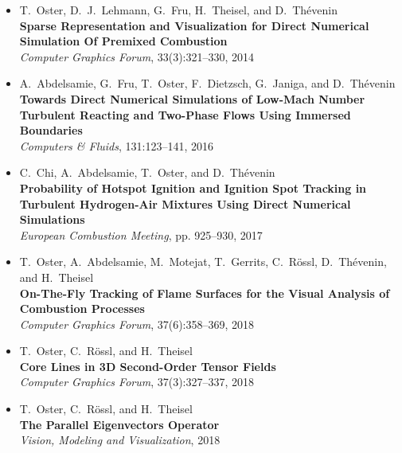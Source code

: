 %
\begin{itemize}[label={},leftmargin=0pt]
    \item T.~Oster, D.~J.~Lehmann, G.~Fru, H.~Theisel, and D.~Thévenin\\
        \textbf{Sparse Representation and Visualization for Direct Numerical Simulation Of
        Premixed Combustion}\\
        {\small \emph{Computer Graphics Forum}, 33(3):321--330, 2014}

    \item A.~Abdelsamie, G.~Fru, T.~Oster, F.~Dietzsch, G.~Janiga, and D.~Thévenin\\
        \textbf{Towards Direct Numerical Simulations of Low-Mach Number Turbulent Reacting
        and Two-Phase Flows Using Immersed Boundaries}\\
        {\small \emph{Computers \& Fluids}, 131:123--141, 2016}

    \item C.~Chi, A.~Abdelsamie, T.~Oster, and D.~Thévenin\\
        \textbf{Probability of Hotspot Ignition and Ignition Spot Tracking in
        Turbulent Hydrogen-Air Mixtures Using Direct Numerical Simulations}\\
        {\small \emph{ European Combustion Meeting}, pp. 925--930, 2017}

    \item T.~Oster, A.~Abdelsamie, M.~Motejat, T.~Gerrits, C.~Rössl, D.~Thévenin, and H.~Theisel\\
        \textbf{On-The-Fly Tracking of Flame Surfaces for the Visual Analysis
        of Combustion Processes}\\
        {\small \emph{Computer Graphics Forum}, 37(6):358--369, 2018}

    \item T.~Oster, C.~Rössl, and H.~Theisel\\
        \textbf{Core Lines in \ac{3D} Second-Order Tensor Fields}\\
        {\small \emph{Computer Graphics Forum}, 37(3):327--337, 2018}

    \item T.~Oster, C.~Rössl, and H.~Theisel\\
        \textbf{The Parallel Eigenvectors Operator}\\
        {\small \emph{Vision, Modeling and Visualization}, 2018}
\end{itemize}
\clearpage

